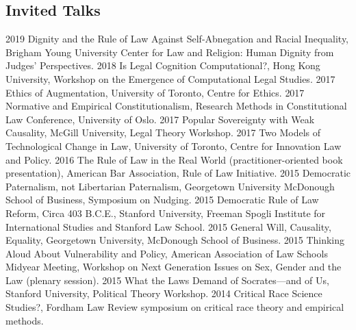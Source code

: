 \documentclass[letterpaper]{moderncv}
\begin{document}
\subsection{Invited Talks}
\cvitem
{2019}
{Dignity and the Rule of Law Against Self-Abnegation and Racial Inequality, Brigham Young University Center for Law and Religion: Human Dignity from Judges' Perspectives.}
\vspace{1mm}
\cvitem
{2018}
{Is Legal Cognition Computational?, Hong Kong University, Workshop on the Emergence of Computational Legal Studies.}
\vspace{1mm}
\cvitem
{2017}
{Ethics of Augmentation, University of Toronto, Centre for Ethics.}
\vspace{1mm}
\cvitem
{2017}
{Normative and Empirical Constitutionalism, Research Methods in Constitutional Law Conference, University of Oslo.}
\vspace{1mm}
\cvitem
{2017}
{Popular Sovereignty with Weak Causality, McGill University, Legal Theory Workshop.}
\vspace{1mm}
\cvitem
{2017}
{Two Models of Technological Change in Law, University of Toronto, Centre for Innovation Law and Policy.}
\vspace{1mm}
\cvitem
{2016}
{The Rule of Law in the Real World (practitioner-oriented book presentation), American Bar Association, Rule of Law Initiative.}
\vspace{1mm}
\cvitem
{2015}
{Democratic Paternalism, not Libertarian Paternalism, Georgetown University McDonough School of Business, Symposium on Nudging.}
\vspace{1mm}
\cvitem
{2015}
{Democratic Rule of Law Reform, Circa 403 B.C.E., Stanford University, Freeman Spogli Institute for International Studies and Stanford Law School.}
\vspace{1mm}
\cvitem
{2015}
{General Will, Causality, Equality, Georgetown University, McDonough School of Business.}
\vspace{1mm}
\cvitem
{2015}
{Thinking Aloud About Vulnerability and Policy, American Association of Law Schools Midyear Meeting, Workshop on Next Generation Issues on Sex, Gender and the Law (plenary session).}
\vspace{1mm}
\cvitem
{2015}
{What the Laws Demand of Socrates---and of Us, Stanford University, Political Theory Workshop.}
\vspace{1mm}
\cvitem
{2014}
{Critical Race Science Studies?, Fordham Law Review symposium on critical race theory and empirical methods.}
\vspace{1mm}
\end{document}
